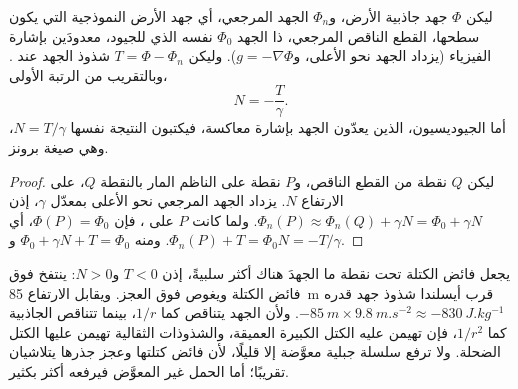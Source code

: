 \begin{proposition}\label{prop:b1:isostasy-gravity:bruns}
ليكن $\Phi$ جهد جاذبية الأرض، و$\Phi_n$ الجهد المرجعي، أي جهد الأرض النموذجية التي يكون سطحها، القطع الناقص المرجعي، ذا الجهد $\Phi_0$ نفسه الذي للجيود، معدودَين بإشارة الفيزياء (يزداد الجهد نحو الأعلى، و$g = -\nabla\Phi$). وليكن $T = \Phi - \Phi_n$ شذوذ الجهد عند . وبالتقريب من الرتبة الأولى،
\[
  N = -\frac{T}{\gamma} .
\]
أما الجيوديسيون، الذين يعدّون الجهد بإشارة معاكسة، فيكتبون النتيجة نفسها $N = T/\gamma$، وهي صيغة برونز.
\end{proposition}

\begin{proof}
ليكن $Q$ نقطة من القطع الناقص، و$P$ نقطة  على الناظم المار بالنقطة $Q$، على الارتفاع $N$. يزداد الجهد المرجعي نحو الأعلى بمعدّل $\gamma$، إذن $\Phi_n(P) \approx \Phi_n(Q) + \gamma N = \Phi_0 +
\gamma N$. ولما كانت $P$ على ، فإن $\Phi(P) = \Phi_0$، أي $\Phi_n(P) + T = \Phi_0$. ومنه $\Phi_0 + \gamma N + T = \Phi_0$ و$N =
-T/\gamma$.
\end{proof}

يجعل فائض الكتلة تحت نقطة ما الجهدَ هناك أكثر سلبيةً، إذن $T < 0$ و$N > 0$: ينتفخ  فوق فائض الكتلة ويغوص فوق العجز. ويقابل الارتفاع \qty{85}{m} قرب أيسلندا شذوذ جهد قدره $-\qty{85}{m}\times\qty{9.8}{m.s^{-2}} \approx \qty{-830}{J.kg^{-1}}$. ولأن الجهد يتناقص كما $1/r$، بينما تتناقص الجاذبية كما $1/r^2$، فإن  تهيمن عليه الكتل الكبيرة العميقة، والشذوذات الثقالية تهيمن عليها الكتل الضحلة. ولا ترفع سلسلة جبلية معوَّضة  إلا قليلًا، لأن فائض كتلتها وعجز جذرها يتلاشيان تقريبًا؛ أما الحمل غير المعوَّض فيرفعه أكثر بكثير.

